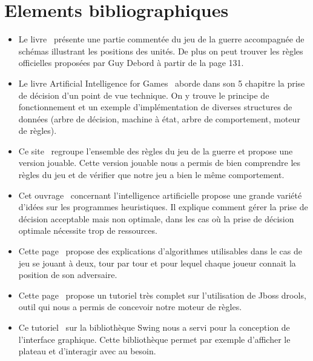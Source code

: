 \documentclass[12pt]{article}
\begin{document}
	\section{Elements bibliographiques}
	\begin{itemize}
	
		\item Le livre~\cite{ref1} présente une partie commentée du jeu de la guerre accompagnée de schémas illustrant les positions des unités. De plus on peut trouver les règles officielles proposées par Guy Debord à partir de la page 131.
		~~\\

		\item Le livre Artificial Intelligence for Games~\cite{ref2} aborde dans son 5 chapitre la prise de décision d'un point de vue technique. On y trouve le principe de fonctionnement et un exemple d'implémentation de diverses structures de données (arbre de décision, machine à état, arbre de comportement, moteur de règles).
		~~\\

		\item Ce site~\cite{ref3} regroupe l'ensemble des règles du jeu de la guerre et propose une version jouable. Cette version jouable nous a permis de bien comprendre les règles du jeu et de vérifier que notre jeu a bien le même comportement.
		~~\\

		\item Cet ouvrage~\cite{ref4} concernant l'intelligence artificielle propose une grande variété d'idées sur les programmes heuristiques. Il explique comment gérer la prise de décision acceptable mais non optimale, dans les cas où la prise de décision optimale nécessite trop de ressources.
		~~\\

		\item Cette page~\cite{ref5} propose des explications d'algorithmes utilisables dans le cas de jeu se jouant à deux, tour par tour et pour lequel chaque joueur connait la position de son adversaire.
		~~\\
		
		\item Cette page~\cite{ref6} propose un tutoriel très complet sur l'utilisation de Jboss drools, outil qui nous a permis de concevoir notre moteur de règles.
		~~\\
		
		\item Ce tutoriel~\cite{ref7} sur la bibliothèque Swing nous a servi pour la conception de l'interface graphique. Cette bibliothèque permet par exemple d'afficher le plateau et d'interagir avec au besoin.
		~~\\

	\end{itemize}

	
	{}
\end{document}
